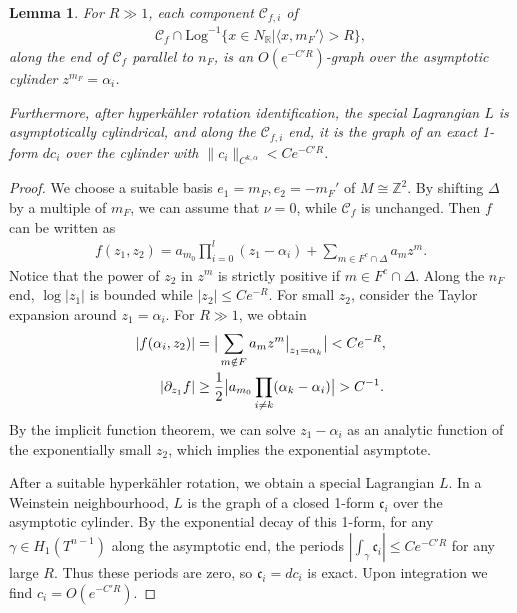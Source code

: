 \documentclass{article}
\newtheorem{lem}[thm]{Lemma}
\theoremstyle{definition}
\begin{document}
	
	\begin{lem}\label{lem: asymp cyl} 
		For $R\gg 1$, each component $\mathcal{C}_{f,i}$ of 
		\begin{align}
			\mathcal{C}_f\cap \text{Log}^{-1}\{x\in N_{\mathbb{R}}|\langle x, m_F' \rangle > R \},
		\end{align}
		along the end of $\mathcal{C}_f$ parallel to $n_F$,
		is an $O(e^{-C'R})$-graph over the asymptotic cylinder $z^{m_F}=\alpha_i$. 
		
		
		Furthermore, after hyperk\"ahler rotation identification, the special Lagrangian $L$ is asymptotically cylindrical, and along the $\mathcal{C}_{f,i}$ end, it is the graph of an exact 1-form $dc_i$ over the cylinder  with $\| c_i\|_{C^{k,\alpha}}<Ce^{-C'R}$.
	\end{lem} 
	\begin{proof}
		We choose a suitable basis $e_1=m_F,e_2=-m_F'$ of $M\cong \mathbb{Z}^2$. By shifting $\Delta$ by a multiple of $m_F$, we can assume that $\nu=0$, while $\mathcal{C}_f$ is unchanged. Then $f$ can be written as 
		\begin{align*}
			f(z_1,z_2)=a_{m_0}\prod_{i=0}^{l} (z_1-\alpha_i)+\sum_{m\in F^c\cap \Delta}a_m z^m.
		\end{align*} 
		Notice that the power of $z_2$ in $z^m$ is strictly positive if $m\in F^c\cap \Delta$. Along the $n_F$ end, $\log |z_1|$ is bounded while $|z_2| \leq C e^{- R}$. For  small $z_2$, consider the Taylor expansion around $z_1=\alpha_i$.
		For $R\gg 1$, we obtain 
		\begin{align} \label{New Year eve}
			|f(\alpha_i,z_2)|&=\big|\sum_{m\notin F}a_mz^m\big|_{z_1=\alpha_k}\big|<Ce^{-R}, \notag \\
			|\partial_{z_1}f|&\geq \frac{1}{2}\big|a_{m_0}\prod_{i\neq  k}(\alpha_k-\alpha_i)\big|>C^{-1}.
		\end{align} 
		By the implicit function theorem, we can solve $z_1-\alpha_i$ as an analytic function of the exponentially small $z_2$, which implies the exponential asymptote.
		
		
		
		
		After a suitable hyperk\"ahler rotation, we obtain a special Lagrangian $L$. In a Weinstein neighbourhood, $L$ is the graph of a closed 1-form $\mathfrak{c}_i$ over the asymptotic cylinder. By the exponential decay of this 1-form, for any $\gamma\in H_1(T^{n-1})$ along the asymptotic end, the periods
		$|\int_{\gamma}\mathfrak{c}_i|\leq Ce^{-C'R}$ for any large $R$. Thus these periods are zero, so $\mathfrak{c}_i= dc_i$ is exact. Upon integration we find $c_i=O(e^{-C'R})$.
	\end{proof}
	
\end{document}
